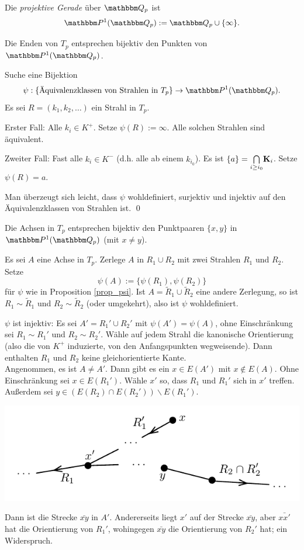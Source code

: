 \documentclass[a4paper, 12pt, twoside]{article}
\begin{document}
\DEF Die \emph{projektive Gerade}
über $\QQ_p$ ist
\[
\PP^1(\QQ_p):=\QQ_p\cup\{\infty\}.
\]

\PROP\label{prop_psi}
Die Enden von $T_p$ entsprechen bijektiv den Punkten von
$\PP^1(\QQ_p)$.

\bew Suche eine Bijektion
\[
\psi:\{\text{Äquivalenzklassen von Strahlen in $T_p$}\}
\Ra \PP^1(\QQ_p).
\]
Es sei $R=(k_1,k_2,\ldots)$ ein Strahl in $T_p$.

Erster Fall: Alle $k_i\in K^+$. Setze $\psi(R):=\infty$.
Alle solchen Strahlen sind äquivalent.

Zweiter Fall: Fast alle $k_i\in K^-$ (d.h. alle ab einem $k_{i_0}$).
Es ist $\{a\}=\overset{}{\underset{i\geq i_0}{\mathop{\bigcap}}} \mathbf{K}_i$.
Setze $\psi(R)=a$.

Man überzeugt sich leicht, dass $\psi$ wohldefiniert, surjektiv und
injektiv auf den Äquivalenzklassen von Strahlen ist.
\qed

\BEM
Die Achsen in $T_p$ entsprechen bijektiv den Punktpaaren
$\{x,y\}$ in $\PP^1(\QQ_p)$ (mit $x\neq y$).

\bew Es sei $A$ eine Achse in $T_p$. Zerlege $A$ in $R_1\cup R_2$
mit zwei Strahlen $R_1$ und $R_2$. Setze
\[
\psi(A) := \{\psi(R_1),\psi(R_2)\}
\]
für $\psi$ wie in Proposition \ref{prop_psi}.
Ist $A=\tilde{R}_1\cup\tilde{R}_2$ eine andere Zerlegung, so ist
$R_1\sim \tilde{R}_1$ und $R_2\sim\tilde{R}_2$ (oder umgekehrt),
also ist $\psi$ wohldefiniert.

$\psi$ ist injektiv: Es sei $A'=R_1'\cup R_2'$ mit
$\psi(A')=\psi(A)$, ohne Einschränkung sei $R_1\sim R_1'$ und
$R_2\sim R_2'$.
Wähle auf jedem Strahl die kanonische Orientierung (also die von
$K^+$ induzierte, von den Anfangspunkten wegweisende).
Dann enthalten $R_1$ und $R_2$ keine gleichorientierte Kante.\\
Angenommen, es ist $A\neq A'$. Dann gibt es ein $x\in E(A')$ mit
$x\not\in E(A)$. Ohne Einschränkung sei $x\in E(R_1')$.
Wähle $x'$ so, dass $R_1$ und $R_1'$ sich in $x'$ treffen.
Außerdem sei $y\in (E(R_2)\cap E(R_2'))\backslash E(R_1')$.
\begin{center}
	\includegraphics{grugraImages/strahlen}
\end{center}
Dann ist die Strecke $\bar{xy}$ in $A'$. Andererseits liegt $x'$
auf der Strecke $\bar{xy}$, aber $\bar{xx'}$ hat die Orientierung
von $R_1'$, wohingegen $\bar{xy}$ die Orientierung von $R_2'$ hat;
ein Widerspruch.
\end{document}
